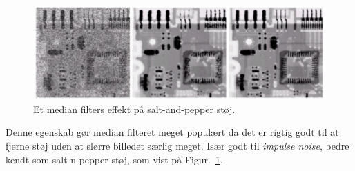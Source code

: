 \begin{figure}[H]
	\centering
	\includegraphics[width=0.9\linewidth]{figs/spm02/median-filter-salt-n-pepper}
	\caption{Et median filters effekt på salt-and-pepper støj.}
	\label{fig:median-filter-salt-n-pepper}
\end{figure}

Denne egenskab gør median filteret meget populært da det er rigtig godt til at fjerne støj uden at slørre billedet særlig meget. Især godt til \textit{impulse noise}, bedre kendt som salt-n-pepper støj, som vist på Figur.~\ref{fig:median-filter-salt-n-pepper}.
